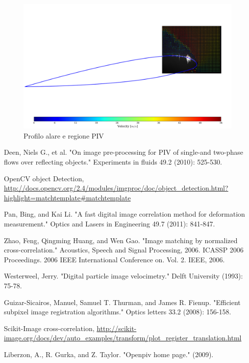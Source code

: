 \documentclass[a4paper]{article}
\begin{document}
\begin{figure}[h]
	\centering
	\includegraphics[width=1\textwidth]{images/All_norm_CM_32_orig.png}
	\caption{Profilo alare e regione PIV}
	\label{fig:airfoil}
\end{figure}

\newpage

\begin{thebibliography}{9}
Deen, Niels G., et al. "On image pre-processing for PIV of single-and two-phase flows over reflecting objects." Experiments in fluids 49.2 (2010): 525-530.

OpenCV object Detection, \url{http://docs.opencv.org/2.4/modules/imgproc/doc/object_detection.html?highlight=matchtemplate#matchtemplate}

Pan, Bing, and Kai Li. "A fast digital image correlation method for deformation measurement." Optics and Lasers in Engineering 49.7 (2011): 841-847.

Zhao, Feng, Qingming Huang, and Wen Gao. "Image matching by normalized cross-correlation." Acoustics, Speech and Signal Processing, 2006. ICASSP 2006 Proceedings. 2006 IEEE International Conference on. Vol. 2. IEEE, 2006.

Westerweel, Jerry. "Digital particle image velocimetry." Delft University (1993): 75-78.

Guizar-Sicairos, Manuel, Samuel T. Thurman, and James R. Fienup. "Efficient subpixel image registration algorithms." Optics letters 33.2 (2008): 156-158.


Scikit-Image cross-correlation,
\url{http://scikit-image.org/docs/dev/auto_examples/transform/plot_register_translation.html}

Liberzon, A., R. Gurka, and Z. Taylor. "Openpiv home page." (2009).

\end{thebibliography}
\end{document}
